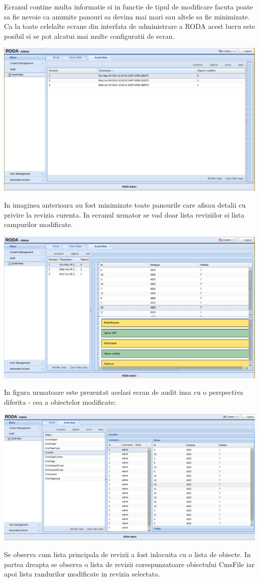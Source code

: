 Ecranul contine multa informatie si in functie de tipul de modificare
facuta poate sa fie nevoie ca anumite panouri sa devina mai mari sau
altele sa fie minimizate. Ca la toate celelalte ecrane din interfata
de administrare a RODA acest lucru este posibil si se pot alcatui
mai multe configuratii de ecran. 

\includegraphics[width=15cm]{audit/audit2}

In imaginea anterioara au fost minimizate toate panourile care afisau
detalii cu privire la revizia curenta. In ecranul urmator se vad doar
lista reviziilor si lista campurilor modificate.

\includegraphics[width=15cm]{audit/audit3}

In figura urmatoare este prezentat acelasi ecran de audit insa cu
o perspectiva diferita - cea a obiectelor modificate:

\includegraphics[width=15cm]{audit/audit4}

Se observa cum lista principala de revizii a fost inlocuita cu o lista
de obiecte. In partea dreapta se observa o lista de revizii corespunzatoare
obiectului CmsFile iar apoi lista randurilor modificate in revizia
selectata. 

